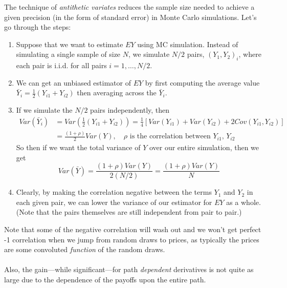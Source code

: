 \documentclass[a4paper,12pt]{scrartcl}
\begin{document}
The technique of \emph{antithetic variates} reduces the sample
size needed to achieve a given precision (in the form of standard error)
in Monte Carlo simulations. Let's go through the steps:
\begin{enumerate}
   \item{Suppose that we want to estimate $EY$ using MC simulation. 
      Instead of simulating a single sample of size $N$, we simulate
      $N/2$ pairs, $(Y_1, Y_2)_i$, where each pair is i.i.d. for
      all pairs $i=1,\ldots,N/2$.}
   \item{We can get an unbiased estimator of $EY$ by first
      computing the average value $\bar{Y}_i = 
      \frac{1}{2}(Y_{i1}+ Y_{i2})$
      then averaging across the $\bar{Y}_i$.} 
   \item{If we simulate the $N/2$ pairs independently, then 
      \begin{align*}
	 Var(\bar{Y}_i) &= Var\left(\frac{1}{2}(Y_{i1}+ Y_{i2})\right) =
	 \frac{1}{4}\left[Var(Y_{i1})+Var(Y_{i2})+2 Cov(Y_{i1}, Y_{i2})
	 \right]
	 \\
	 &=  \frac{(1+\rho)}{2} Var(Y), \quad \text{$\rho$ is the 
	    correlation between $Y_{i1}$, $Y_{i2}$}
      \end{align*}
      So then if we want the total variance of $Y$ over our entire 
      simulation, then we get 
	 \[ Var(\bar{Y}) = \frac{(1+\rho) Var(Y)}{ 2 (N/2)}
	    = \frac{(1+\rho) Var(Y)}{N} \]
      }
   \item{Clearly, by making the correlation negative between the 
      terms $Y_1$ and $Y_2$ in each given pair, we can lower the variance
      of our estimator for $EY$ as a whole.  (Note that the pairs
      themselves are still independent from pair to pair.)}
\end{enumerate}
Note that some of the negative correlation will wash out and we
won't get perfect -1 correlation when we jump from random draws to
prices, as typically the prices are some convoluted \emph{function}
of the random draws.
\\
\\
Also, the gain---while significant---for path \emph{dependent} 
derivatives is not quite as large due to the dependence of the payoffs
upon the entire path.
\end{document}
